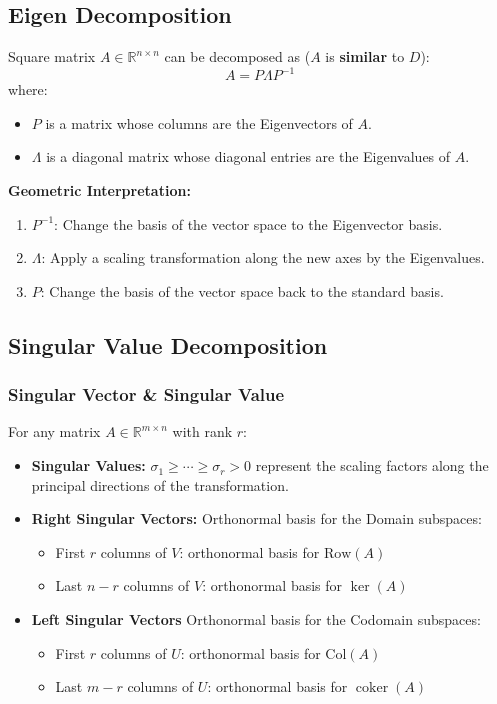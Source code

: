 \documentclass{article}
\begin{document}
\subsection{Eigen Decomposition}

Square matrix $A \in \mathbb{R}^{n \times n}$ can be decomposed as ($A$ is \textbf{similar} to $D$):
\[
    A = P \Lambda P ^{-1}
\]
where:
\begin{itemize}
    \item $P$ is a matrix whose columns are the Eigenvectors of $A$.
    \item $\Lambda$ is a diagonal matrix whose diagonal entries are the Eigenvalues of $A$.
\end{itemize}
\textbf{Geometric Interpretation:}
\begin{enumerate}
    \item $P^{-1}$: Change the basis of the vector space to the Eigenvector basis.
    \item $\Lambda$: Apply a scaling transformation along the new axes by the Eigenvalues.
    \item $P$: Change the basis of the vector space back to the standard basis.
\end{enumerate}

\subsection{Singular Value Decomposition}

\subsubsection{Singular Vector \& Singular Value}
For any matrix $A \in \mathbb{R}^{m \times n}$ with rank $r$:
\begin{itemize}
    \item \textbf{Singular Values:} $\sigma_1 \geq \cdots \geq \sigma_r > 0$ represent the scaling factors along the principal directions of the transformation.
    \item \textbf{Right Singular Vectors:} Orthonormal basis for the Domain subspaces:
        \begin{itemize}
            \item First $r$ columns of $V$: orthonormal basis for $\text{Row}(A)$
            \item Last $n-r$ columns of $V$: orthonormal basis for $\ker(A)$
        \end{itemize}
    \item \textbf{Left Singular Vectors} Orthonormal basis for the Codomain subspaces:
        \begin{itemize}
            \item First $r$ columns of $U$: orthonormal basis for $\text{Col}(A)$
            \item Last $m-r$ columns of $U$: orthonormal basis for $\operatorname{coker}(A)$
        \end{itemize}
\end{itemize}
\end{document}
